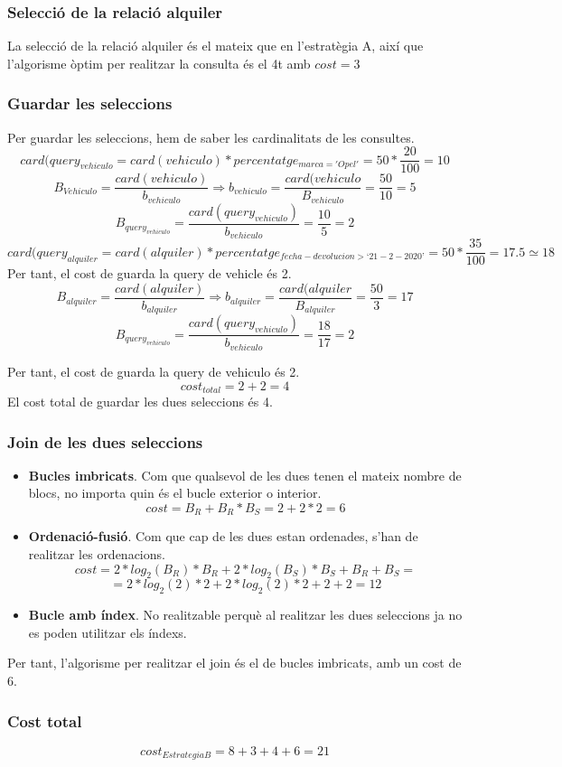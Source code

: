 \documentclass[12pt]{article}
\begin{document}
\subsubsection{Selecció de la relació alquiler}
La selecció de la relació alquiler és el mateix que en l'estratègia A, així que l'algorisme òptim per realitzar la consulta és el 4t amb $ cost = 3 $
\subsubsection{Guardar les seleccions}
Per guardar les seleccions, hem de saber les cardinalitats de les consultes.
\[card(query_{vehiculo}= card(vehiculo) * percentatge_{marca='Opel'}=50*\frac{20}{100}=10\]
\[B_{Vehiculo}=\frac{card(vehiculo)}{b_{vehiculo}}\Rightarrow b_{vehiculo}=\frac{card(vehiculo}{B_{vehiculo}} = \frac{50}{10}=5\]
\[B_{query_{vehiculo}}=\frac{card(query_{vehiculo})}{b_{vehiculo}}=\frac{10}{5}=2\]
\[card(query_{alquiler}= card(alquiler) * percentatge_{fecha-devolucion > ‘21-2-2020’}=50*\frac{35}{100}=17.5 \simeq 18
\]
Per tant, el cost de guarda la query de vehicle és 2.
\[B_{alquiler}=\frac{card(alquiler)}{b_{alquiler}}\Rightarrow b_{alquiler}=\frac{card(alquiler}{B_{alquiler}} = \frac{50}{3}=17\]
\[B_{query_{vehiculo}}=\frac{card(query_{vehiculo})}{b_{vehiculo}}=\frac{18}{17}=2\]

Per tant, el cost de guarda la query de vehiculo és 2.
\[cost_{total} = 2 + 2 = 4\]
El cost total de guardar les dues seleccions és 4.
\subsubsection{Join de les dues seleccions}
\begin{itemize}
	\item \textbf{Bucles imbricats}. Com que qualsevol de les dues tenen el mateix nombre de blocs, no importa quin és el bucle exterior o interior.
	\[cost = B_R + B_R * B_S = 2+2*2= 6\]
	\item \textbf{Ordenació-fusió}. Com que cap de les dues estan ordenades, s'han de realitzar les ordenacions.
	\[cost =2*log_2(B_{R})*B_{R}+2*log_2(B_{S})*B_{S}+B_{R}+B_{S}=\]
	\[= 2 *log_2(2)*2+2 *log_2(2)*2+2+2=12\]
	\item \textbf{Bucle amb índex}. No realitzable perquè al realitzar les dues seleccions ja no es poden utilitzar els índexs.
\end{itemize}

Per tant, l'algorisme per realitzar el join és el de bucles imbricats, amb un cost de 6.
\subsubsection{Cost total}
\[cost_{EstrategiaB}=8+3+4+6=21\]
\end{document}
